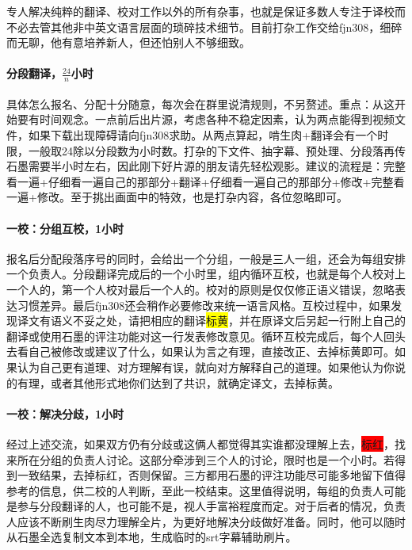 \documentclass{ctexart}
\begin{document}
专人解决纯粹的翻译、校对工作以外的所有杂事，也就是保证多数人专注于译校而不必去管其他非中英文语言层面的琐碎技术细节。目前打杂工作交给fjn308，细碎而无聊，他有意培养新人，但还怕别人不够细致。

\paragraph{分段翻译，$\frac{24}{n}$小时}

具体怎么报名、分配十分随意，每次会在群里说清规则，不另赘述。重点：从这开始要有时间观念。一点前后出片源，考虑各种不稳定因素，认为两点能得到视频文件，如果下载出现障碍请向fjn308求助。从两点算起，啃生肉+翻译会有一个时限，一般取24除以分段数为小时数。打杂的下文件、抽字幕、预处理、分段落再传石墨需要半小时左右，因此刚下好片源的朋友请先轻松观影。建议的流程是：完整看一遍+仔细看一遍自己的那部分+翻译+仔细看一遍自己的那部分+修改+完整看一遍+修改。至于挑出画面中的特效，也是打杂内容，各位忽略即可。

\paragraph{一校：分组互校，1小时}

报名后分配段落序号的同时，会给出一个分组，一般是三人一组，还会为每组安排一个负责人。分段翻译完成后的一个小时里，组内循环互校，也就是每个人校对上一个人的，第一个人校对最后一个人的。校对的原则是仅仅修正语义错误，忽略表达习惯差异。最后fjn308还会稍作必要修改来统一语言风格。互校过程中，如果发现译文有语义不妥之处，请把相应的翻译\colorbox{yellow}{标黄}，并在原译文后另起一行附上自己的翻译或使用石墨的评注功能对这一行发表修改意见。循环互校完成后，每个人回头去看自己被修改或建议了什么，如果认为言之有理，直接改正、去掉标黄即可。如果认为自己更有道理、对方理解有误，就向对方解释自己的道理。如果他认为你说的有理，或者其他形式地你们达到了共识，就确定译文，去掉标黄。

\paragraph{一校：解决分歧，1小时}

经过上述交流，如果双方仍有分歧或这俩人都觉得其实谁都没理解上去，\colorbox{red}{标红}，找来所在分组的负责人讨论。这部分牵涉到三个人的讨论，限时也是一个小时。若得到一致结果，去掉标红，否则保留。三方都用石墨的评注功能尽可能多地留下值得参考的信息，供二校的人判断，至此一校结束。这里值得说明，每组的负责人可能是参与分段翻译的人，也可能不是，视人手富裕程度而定。对于后者的情况，负责人应该不断刷生肉尽力理解全片，为更好地解决分歧做好准备。同时，他可以随时从石墨全选复制文本到本地，生成临时的srt字幕辅助刷片。
\end{document}

